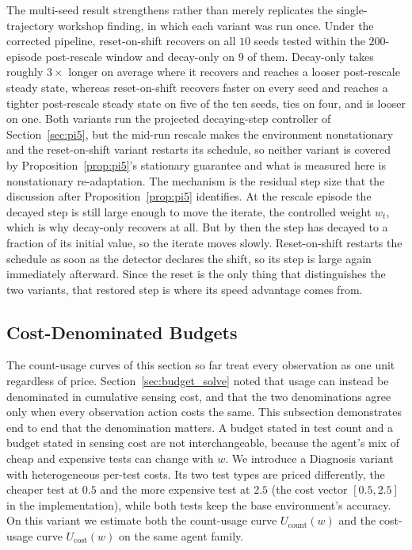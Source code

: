 The multi-seed result strengthens rather than merely replicates the single-trajectory workshop finding, in which each variant was run once. Under the corrected pipeline, reset-on-shift recovers on all $10$ seeds tested within the $200$-episode post-rescale window and decay-only on $9$ of them. Decay-only takes roughly $3\times$ longer on average where it recovers and reaches a looser post-rescale steady state, whereas reset-on-shift recovers faster on every seed and reaches a tighter post-rescale steady state on five of the ten seeds, ties on four, and is looser on one. Both variants run the projected decaying-step controller of Section~\ref{sec:pi5}, but the mid-run rescale makes the environment nonstationary and the reset-on-shift variant restarts its schedule, so neither variant is covered by Proposition~\ref{prop:pi5}'s stationary guarantee and what is measured here is nonstationary re-adaptation. The mechanism is the residual step size that the discussion after Proposition~\ref{prop:pi5} identifies. At the rescale episode the decayed step is still large enough to move the iterate, the controlled weight $w_t$, which is why decay-only recovers at all. But by then the step has decayed to a fraction of its initial value, so the iterate moves slowly. Reset-on-shift restarts the schedule as soon as the detector declares the shift, so its step is large again immediately afterward. Since the reset is the only thing that distinguishes the two variants, that restored step is where its speed advantage comes from.

\subsection{Cost-Denominated Budgets}
\label{sec:cost_budget}

The count-usage curves of this section so far treat every observation as one unit regardless of price. Section~\ref{sec:budget_solve} noted that usage can instead be denominated in cumulative sensing cost, and that the two denominations agree only when every observation action costs the same. This subsection demonstrates end to end that the denomination matters. A budget stated in test count and a budget stated in sensing cost are not interchangeable, because the agent's mix of cheap and expensive tests can change with $w$. We introduce a Diagnosis variant with heterogeneous per-test costs. Its two test types are priced differently, the cheaper test at $0.5$ and the more expensive test at $2.5$ (the cost vector $[0.5, 2.5]$ in the implementation), while both tests keep the base environment's accuracy. On this variant we estimate both the count-usage curve $U_{\mathrm{count}}(w)$ and the cost-usage curve $U_{\mathrm{cost}}(w)$ on the same agent family.

